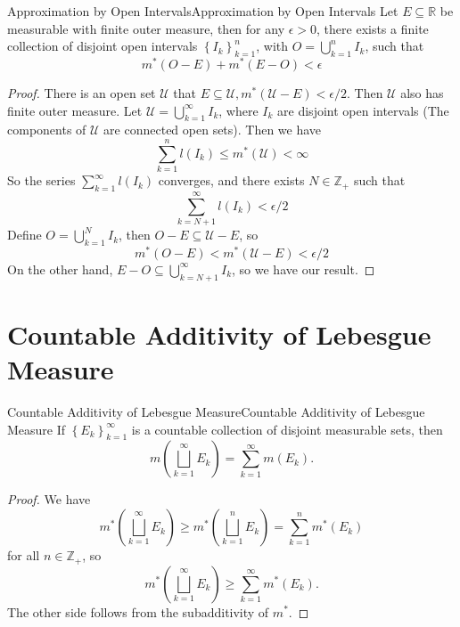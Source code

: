 \documentclass[../main.tex]{subfiles}
\begin{document}
\begin{theorem}{Approximation by Open Intervals}{Approximation by Open Intervals}
	Let $E \subseteq \mathbb{R}$ be measurable with finite outer measure, then for any $\epsilon > 0$, there exists a finite collection of disjoint open intervals $\left\{ I_k \right\}_{k=1}^{n}$, with $O = \bigcup_{k=1}^{n} I_k$, such that
	\begin{equation*}
		m^*(O-E) + m^*(E-O) < \epsilon
	\end{equation*}
\end{theorem}
\begin{proof}
	There is an open set $\mathcal{U}$ that $E \subseteq \mathcal{U}, m^*(\mathcal{U}-E) < \epsilon / 2$. Then $\mathcal{U}$ also has finite outer measure. Let $\mathcal{U} = \bigcup_{k=1}^{\infty } I_k$, where $I_k$ are disjoint open intervals (The components of $\mathcal{U}$ are connected open sets). Then we have
	\begin{equation*}
		\sum_{k=1}^{n} l(I_k) \leq m^*(\mathcal{U}) < \infty
	\end{equation*}
	So the series $\sum_{k=1}^{\infty } l(I_k)$ converges, and there exists $N\in \mathbb{Z}_+$ such that
	\begin{equation*}
		\sum_{k=N+1}^{\infty } l(I_k) < \epsilon / 2
	\end{equation*}
	Define $O = \bigcup_{k=1}^{N} I_k$, then $O-E \subseteq \mathcal{U}-E$, so
	\begin{equation*}
		m^*(O-E) < m^*(\mathcal{U}-E) < \epsilon / 2
	\end{equation*}
	On the other hand, $E-O \subseteq \bigcup_{k=N+1}^{\infty } I_k$, so we have our result.
\end{proof}


\section{Countable Additivity of Lebesgue Measure}

\begin{theorem}{Countable Additivity of Lebesgue Measure}{Countable Additivity of Lebesgue Measure}
	If $\left\{ E_k \right\}_{k=1}^{\infty }$ is a countable collection of disjoint measurable sets, then
	\begin{equation*}
		m\left( \bigsqcup_{k=1}^{\infty } E_k \right) = \sum_{k=1}^{\infty } m(E_k).
	\end{equation*}
\end{theorem}
\begin{proof}
We have
\begin{equation*}
	m^*\left( \bigsqcup_{k=1}^{\infty } E_k \right) \geq m^* \left( \bigsqcup_{k=1}^{n} E_k \right) = \sum_{k=1}^{n} m^*(E_k)
\end{equation*}
for all $n\in \mathbb{Z}_+$, so
\begin{equation*}
	m^*\left( \bigsqcup_{k=1}^{\infty } E_k \right) \geq \sum_{k=1}^{\infty } m^*(E_k).
\end{equation*}
The other side follows from the subadditivity of $m^*$.
\end{proof}
\end{document}
